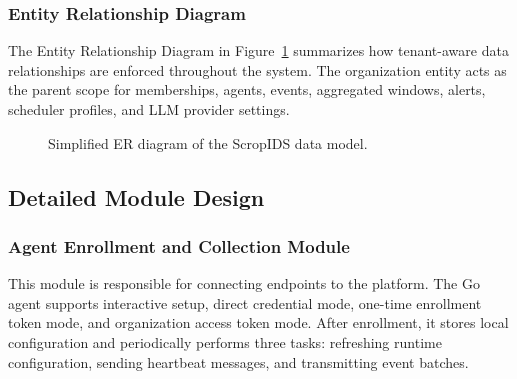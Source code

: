 \documentclass[12pt,a4paper]{article}
\begin{document}
\subsubsection{Entity Relationship Diagram}
The Entity Relationship Diagram in Figure~\ref{fig:erd} summarizes how tenant-aware data relationships are enforced throughout the system. The organization entity acts as the parent scope for memberships, agents, events, aggregated windows, alerts, scheduler profiles, and LLM provider settings.

\begin{figure}[H]
\centering
{}
\caption{Simplified ER diagram of the ScropIDS data model.}
\label{fig:erd}
\end{figure}

\subsection{Detailed Module Design}

\subsubsection{Agent Enrollment and Collection Module}
This module is responsible for connecting endpoints to the platform. The Go agent supports interactive setup, direct credential mode, one-time enrollment token mode, and organization access token mode. After enrollment, it stores local configuration and periodically performs three tasks: refreshing runtime configuration, sending heartbeat messages, and transmitting event batches.
\end{document}
